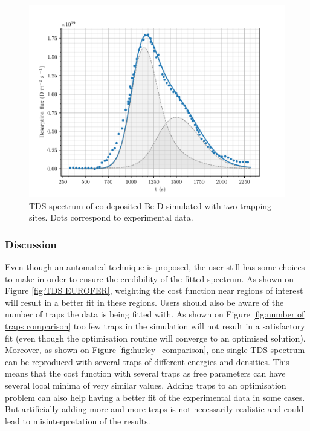 \begin{figure} [h!]
    \centering
    \includegraphics[width=0.9\linewidth]{Figures/Chapter3/Parametric_optimisation/baldwin_be.pdf}
    \caption{TDS spectrum of co-deposited Be-D \cite{baldwin_experimental_2014} simulated with two trapping sites. Dots correspond to experimental data.}
    \label{fig:TDS baldwin}
\end{figure}

\subsubsection{Discussion}

Even though an automated technique is proposed, the user still has some choices to make in order to ensure the credibility of the fitted spectrum.
As shown on Figure \ref{fig:TDS EUROFER}, weighting the cost function near regions of interest will result in a better fit in these regions.
Users should also be aware of the number of traps the data is being fitted with.
As shown on Figure \ref{fig:number of traps comparison} too few traps in the simulation will not result in a satisfactory fit (even though the optimisation routine will converge to an optimised solution).
Moreover, as shown on Figure \ref{fig:hurley_comparison}, one single TDS spectrum can be reproduced with several traps of different energies and densities.
This means that the cost function with several traps as free parameters can have several local minima of very similar values.
Adding traps to an optimisation problem can also help having a better fit of the experimental data in some cases.
But artificially adding more and more traps is not necessarily realistic and could lead to misinterpretation of the results.

